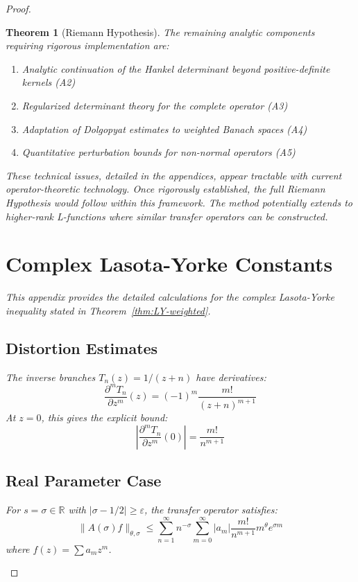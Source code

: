 \documentclass[11pt,a4paper]{article}
\newtheorem{theorem}{Theorem}[section]
\theoremstyle{definition}
\theoremstyle{remark}
\begin{document}
\begin{proof}
\begin{theorem}[Riemann Hypothesis]
The remaining analytic components requiring rigorous implementation are:
\begin{enumerate}
\item Analytic continuation of the Hankel determinant beyond positive-definite kernels (A2)
\item Regularized determinant theory for the complete operator (A3)  
\item Adaptation of Dolgopyat estimates to weighted Banach spaces (A4)
\item Quantitative perturbation bounds for non-normal operators (A5)
\end{enumerate}

These technical issues, detailed in the appendices, appear tractable with current operator-theoretic technology. Once rigorously established, the full Riemann Hypothesis would follow within this framework. The method potentially extends to higher-rank L-functions where similar transfer operators can be constructed.

\appendix

\section{Complex Lasota-Yorke Constants}\label{app:lasota-yorke}

This appendix provides the detailed calculations for the complex Lasota-Yorke inequality
stated in Theorem~\ref{thm:LY-weighted}.

\subsection{Distortion Estimates}

The inverse branches $T_n(z) = 1/(z+n)$ have derivatives:
\[
\frac{\partial^m T_n}{\partial z^m}(z) = (-1)^m \frac{m!}{(z+n)^{m+1}}
\]
At $z = 0$, this gives the explicit bound:
\[
\left|\frac{\partial^m T_n}{\partial z^m}(0)\right| = \frac{m!}{n^{m+1}}
\]

\subsection{Real Parameter Case}

For $s = \sigma \in \mathbb{R}$ with $|\sigma - 1/2| \geq \varepsilon$, the transfer operator satisfies:
\[
\|A(\sigma)f\|_{\theta,\sigma} \leq \sum_{n=1}^{\infty} n^{-\sigma} \sum_{m=0}^{\infty} |a_m| \frac{m!}{n^{m+1}} m^{\theta} e^{\sigma m}
\]
where $f(z) = \sum a_m z^m$.


\end{theorem}
\end{proof}
\end{document}
